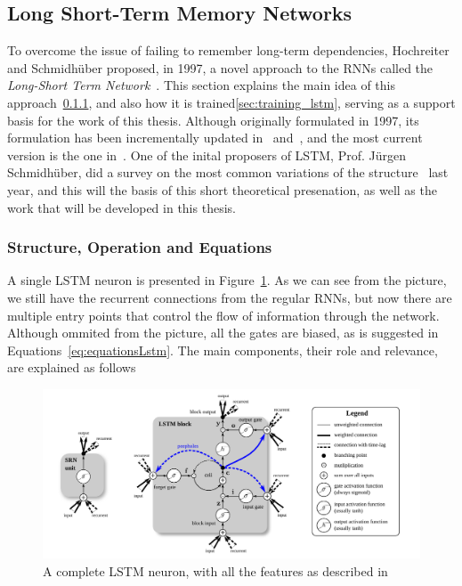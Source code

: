\subsection{Long Short-Term Memory Networks}\label{sec:theorBack_lstm}
To overcome the issue of failing to remember long-term dependencies, Hochreiter and Schmidhüber proposed, in 1997, a novel approach to the RNNs called the \textit{Long-Short Term Network}~\cite{Hoch97}. This section explains the main idea of this approach~\ref{sec:struct_lstm}, and also how it is trained\ref{sec:training_lstm}, serving as a support basis for the work of this thesis.
Although originally formulated in 1997, its formulation has been incrementally updated in~\cite{Gers00} and~\cite{Gers2000}, and the most current version is the one in~\cite{Graves05}. One of the inital proposers of LSTM, Prof. Jürgen Schmidhüber, did a survey on the most common variations of the structure~\cite{Greff15} last year, and this will the basis of this short theoretical presenation, as well as the work that will be developed in this thesis. 

\subsubsection{Structure, Operation and Equations}\label{sec:struct_lstm}
A single LSTM neuron is presented in Figure~\ref{fig:lstmneuron}. As we can see from the picture, we still have the recurrent connections from the regular RNNs, but now there are multiple entry points that control the flow of information through the network. Although ommited from the  picture, all the gates are biased, as is suggested in Equations~\ref{eq:equationsLstm}. The main components, their role and relevance, are explained as follows


\begin{figure}[H]
	\centering
	\includegraphics[width=0.9\linewidth]{figures/lstmneuron.png}
    \caption{A complete LSTM neuron, with all the features as described in~\cite{Graves05}}
	\label{fig:lstmneuron}
\end{figure}

